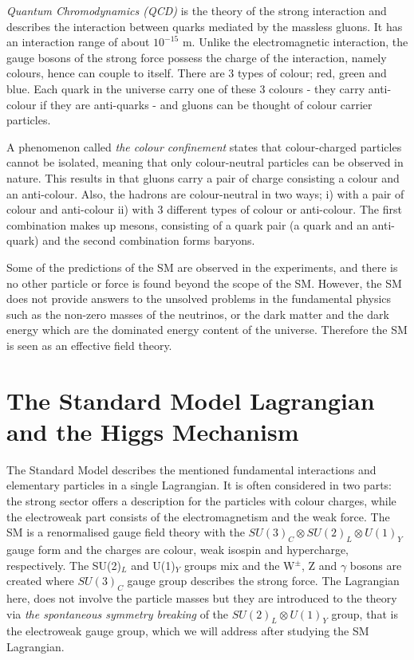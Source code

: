 \emph{Quantum Chromodynamics (QCD)} is the theory of the strong interaction and describes the interaction between quarks mediated by the massless gluons. It has an interaction range of about $10^{-15}$ m. Unlike the electromagnetic interaction, the gauge bosons of the strong force possess the charge of the interaction, namely colours, hence can couple to itself. There are 3 types of colour; red, green and blue. Each quark in the universe carry one of these 3 colours - they carry anti-colour if they are anti-quarks - and gluons can be thought of colour carrier particles.

A phenomenon called \emph{the colour confinement} states that colour-charged particles cannot be isolated, meaning that only colour-neutral particles can be observed in nature\footnotemark. This results in that gluons carry a pair of charge consisting a colour and an anti-colour. Also, the hadrons are colour-neutral in two ways; i) with a pair of colour and anti-colour ii) with 3 different types of colour or anti-colour. The first combination makes up mesons, consisting of a quark pair (a quark and an anti-quark) and the second combination forms baryons.


Some of the predictions of the SM are observed in the experiments, and there is no other particle or force is found beyond the scope of the SM. However, the SM does not provide answers to the unsolved problems in the fundamental physics such as the non-zero masses of the neutrinos\cite{neutrino-mass}, or the dark matter and the dark energy\cite{PlanckCol} which are the dominated energy content of the universe. Therefore the SM is seen as an effective field theory.

\section{The Standard Model Lagrangian and the Higgs Mechanism}
\label{theSMandHiggs}

The Standard Model describes the mentioned fundamental interactions and elementary particles in a single Lagrangian. It is often considered in two parts: the strong sector offers a description for the particles with colour charges, while the electroweak part consists of the electromagnetism and the weak force. The SM is a renormalised gauge field theory with the $ SU(3)_C \otimes SU(2)_L \otimes U(1)_Y$ gauge form and the charges are colour, weak isospin and hypercharge, respectively. The SU(2)$_L$ and U(1)$_Y$ groups mix and the W$^{\pm}$, Z and $\gamma$ bosons are created where $SU(3)_C$ gauge group describes the strong force. The Lagrangian here, does not involve the particle masses but they are introduced to the theory via \emph{the spontaneous symmetry breaking} of the $SU(2)_L \otimes U(1)_Y$ group, that is the electroweak gauge group, which we will address after studying the SM Lagrangian.

